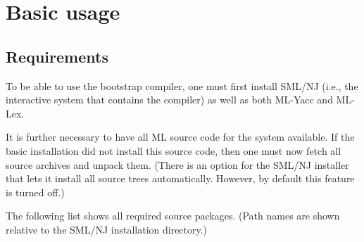 
\section{Basic usage}

\subsection{Requirements}

To be able to use the bootstrap compiler, one must first install
SML/NJ (i.e., the interactive system that contains the compiler) as
well as both ML-Yacc and ML-Lex.

It is further necessary to have all ML source code for the system
available.  If the basic installation did not install this source
code, then one must now fetch all source archives and unpack them.
(There is an option for the SML/NJ installer that lets it install all
source trees automatically.  However, by default this feature is turned
off.)

The following list shows all required source packages.  (Path names
are shown relative to the SML/NJ installation directory.)

